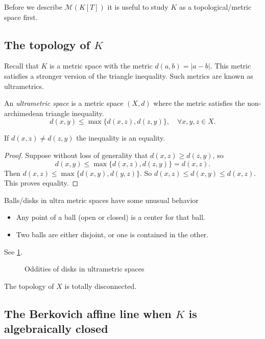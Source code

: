 Before we describe $\mathcal{M} (K[T])$ it is useful to study $K$ as a topological/metric space first.
\subsection{The topology of $K$} \label{sec:ultrametric_spaces}

Recall that $K$ is a metric space with the metric $d(a, b) = |a - b|$. 
This metric satisfies a stronger version of the triangle inequality. 
Such metrics are known as ultrametrics. 
\begin{definition}
	An \emph{ultrametric space} is a metric space $(X, d)$ where the metric satisfies the non-archimedean triangle inequality. 
	\[
		d(x, y) \le \max \{d(x, z) ,d(z, y)\}, \quad \forall x, y ,z \in X
	.\] 
\end{definition}
\begin{lemma}
	If $d(x,z) \ne d(z,y)$ the inequality is an equality. 
\end{lemma}
\begin{proof}
	Suppose without loss of generality that $d(x, z) \ge d(z,y)$, so 
	\[	
		d(x, y) \le \max \{d(x, z), d(z,y)\} = d(x, z)
	.\] 
	Then $d(x, z) \le \max \{d(x, y), d(y,z)\}$. So $d(x, z) \le d(x, y) \le d(x, z)$. This proves equality.
\end{proof}
\begin{corollary}
	Balls/disks in ultra metric spaces have some unusual behavior
	\begin{itemize}
		\item Any point of a ball (open or closed) is a center for that ball. 
		\item Two balls are either disjoint, or one is contained in the other.  
	\end{itemize}
	See \cref{fig:oddities_of_ultrametric_balls}.
\end{corollary}
\begin{figure}[h]
    \centering
    \caption{Oddities of disks in ultrametric spaces}
    \label{fig:oddities_of_ultrametric_balls}
\end{figure}
\begin{corollary}
	The topology of $X$ is totally disconnected. 
\end{corollary}

\subsection{The Berkovich affine line when $K$ is algebraically closed} \label{sec:the_berkovich_affine_line_K_alg_closed}

